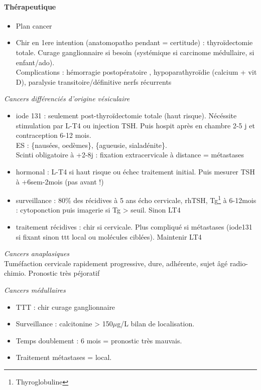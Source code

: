 \documentclass[11pt]{article}
\begin{document}
\paragraph{Thérapeutique}
\label{sec:org618e165}
\begin{itemize}
\item Plan cancer
\item Chir en 1ere intention (anatomopatho pendant = certitude) : thyroïdectomie
totale. Curage ganglionnaire si besoin (systémique si carcinome médullaire,
si enfant/ado). \\
Complications : hémorragie postopératoire ,  hypoparathyroïdie (calcium + vit D), paralysie transitoire/définitive nerfs récurrents
\end{itemize}
\vspace*{10pt}

\emph{Cancers différenciés d'origine vésiculaire}
\begin{itemize}
\item iode 131 : seulement post-thyroïdectomie totale (haut risque). Nécéssite
stimulation par L-T4 ou injection TSH. Puis hospit après en chambre 2-5 j
et contraception 6-12 mois. \\
ES : \{nausées, oedèmes\}, \{agueusie, sialadénite\}. \\
Scinti  obligatoire à +2-8j : fixation extracervicale à  distance = métastases
\item hormonal : L-T4 si haut risque ou échec traitement initial. Puis mesurer TSH à
+6sem-2mois (pas avant !)
\item surveillance : 80\% des récidives à 5 ans \thus écho cervicale, rhTSH,
Tg\footnote{Thyroglobuline} à 6-12mois : cytoponction puis imagerie si Tg > seuil. Sinon \dec LT4
\item traitement récidives : chir si cervicale. Plus compliqué si métastases
(iode131 si fixant sinon ttt local ou molécules ciblées). Maintenir LT4
\end{itemize}

\emph{Cancers anaplasiques}\\
Tuméfaction cervicale rapidement progressive, dure, adhérente, sujet âgé \thus radio-chimio. Pronostic très péjoratif

\emph{Cancers médullaires}
\begin{itemize}
\item TTT : chir \textpm{} curage ganglionnaire
\item Surveillance : calcitonine > 150\(\mu\)g/L \thus bilan de localisation.
\item Temps doublement : 6 mois = pronostic très mauvais.
\item Traitement métastases = local.
\end{itemize}
\end{document}
